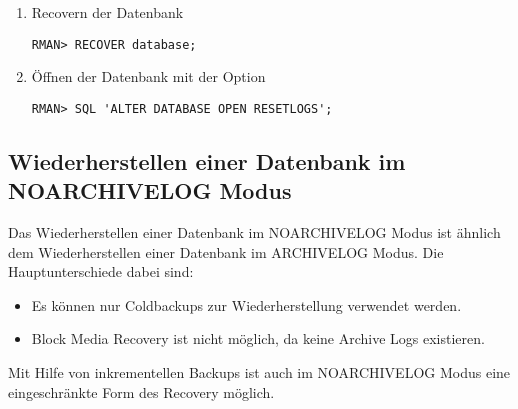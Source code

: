 \begin{enumerate}
            \item Recovern der Datenbank
              \begin{lstlisting}[caption={Recovern der Datenbank},label=admin1529,language=rman]
RMAN> RECOVER database;
              \end{lstlisting}
            \item Öffnen der Datenbank mit der Option 
              \begin{lstlisting}[caption={Datenbank mit open resetlogs öffnen},label=admin1530,language=rman,emph={[9]ALTER,DATABASE,OPEN,RESETLOGS},emphstyle={[9]\color{magenta}\bfseries}]
RMAN> SQL 'ALTER DATABASE OPEN RESETLOGS';
              \end{lstlisting}
            \end{enumerate}
      \subsection{Wiederherstellen einer Datenbank im NOARCHIVELOG Modus}
        Das Wiederherstellen einer Datenbank im NOARCHIVELOG Modus ist ähnlich dem Wiederherstellen einer Datenbank im ARCHIVELOG Modus. Die Hauptunterschiede dabei sind:
        \begin{itemize}
          \item Es können nur Coldbackups zur Wiederherstellung verwendet werden.
          \item Block Media Recovery ist nicht möglich, da keine Archive Logs existieren.
        \end{itemize}
        Mit Hilfe von inkrementellen Backups ist auch im NOARCHIVELOG Modus eine eingeschränkte Form des Recovery möglich.


